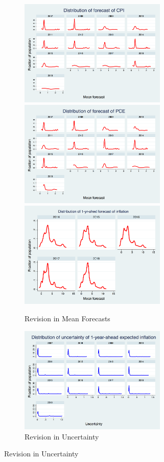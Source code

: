 \documentclass[]{article}
\begin{document}
	
	\begin{figure}[ht]
		\begin{subfigure}[b]{0.5\textwidth}
		\centering
		\caption{Revision in Mean Forecasts}
		\includegraphics[width=7cm]{figures/PRCCPIMean1_hist.png} 
		\smallskip
		\includegraphics[width=7cm]{figures/PRCPCEMean1_hist.png} 
		\smallskip
		\includegraphics[width=7cm]{figures/SCEmean_hist.png} 
		\end{subfigure}
	   \hfill 
	  	\begin{subfigure}[b]{0.5\textwidth}
	  	\caption{Revision in Uncertainty}
		\includegraphics[width=7cm]{figures/PRCCPIVar1_hist.png}  

\end{subfigure}
\end{figure}
\end{document}

